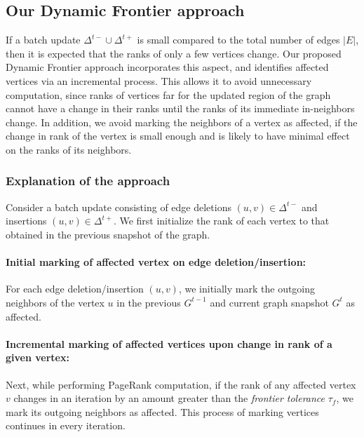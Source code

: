 \subsection{Our Dynamic Frontier approach}
\label{sec:frontier}

If a batch update $\Delta^{t-} \cup \Delta^{t+}$ is small compared to the total number of edges $|E|$, then it is expected that the ranks of only a few vertices change. Our proposed Dynamic Frontier approach incorporates this aspect, and identifies affected vertices via an incremental process. This allows it to avoid unnecessary computation, since ranks of vertices far for the updated region of the graph cannot have a change in their ranks until the ranks of its immediate in-neighbors change. In addition, we avoid marking the neighbors of a vertex as affected, if the change in rank of the vertex is small enough and is likely to have minimal effect on the ranks of its neighbors.


\subsubsection{Explanation of the approach}
\label{sec:frontier-explanation}

Consider a batch update consisting of edge deletions $(u, v) \in \Delta^{t-}$ and insertions $(u, v) \in \Delta^{t+}$. We first initialize the rank of each vertex to that obtained in the previous snapshot of the graph.



\paragraph{Initial marking of affected vertex on edge deletion/insertion:}

For each edge deletion/insertion $(u, v)$, we initially mark the outgoing neighbors of the vertex $u$ in the previous $G^{t-1}$ and current graph snapshot $G^t$ as affected.

\paragraph{Incremental marking of affected vertices upon change in rank of a given vertex:}

Next, while performing PageRank computation, if the rank of any affected vertex $v$ changes in an iteration by an amount greater than the \textit{frontier tolerance} $\tau_f$, we mark its outgoing neighbors as affected. This process of marking vertices continues in every iteration.


